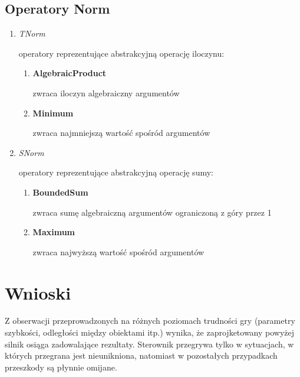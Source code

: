 \documentclass{article}
\begin{document}
\subsection {Operatory Norm}

\begin{enumerate}
\item \emph{TNorm}

  operatory reprezentujące abstrakcyjną operację iloczynu:

  \begin{enumerate}
  \item \textbf{AlgebraicProduct}

    zwraca iloczyn algebraiczny argumentów

  \item \textbf{Minimum}

    zwraca najmniejszą wartość spośród argumentów

  \end{enumerate}

\item \emph{SNorm}

  operatory reprezentujące abstrakcyjną operację sumy:

  \begin{enumerate}
  \item \textbf{BoundedSum}

    zwraca sumę algebraiczną argumentów ograniczoną z góry przez 1

  \item \textbf{Maximum}

    zwraca najwyższą wartość spośród argumentów

  \end{enumerate}

\end{enumerate}

\section {Wnioski}

Z obserwacji przeprowadzonych na różnych poziomach trudności gry (parametry
szybkości, odległości między obiektami itp.) wynika, że zaprojketowany powyżej
silnik osiąga zadowalające rezultaty. Sterownik przegrywa tylko w sytuacjach, w
których przegrana jest nieunikniona, natomiast w pozostałych przypadkach
przeszkody są płynnie omijane.
\end{document}
